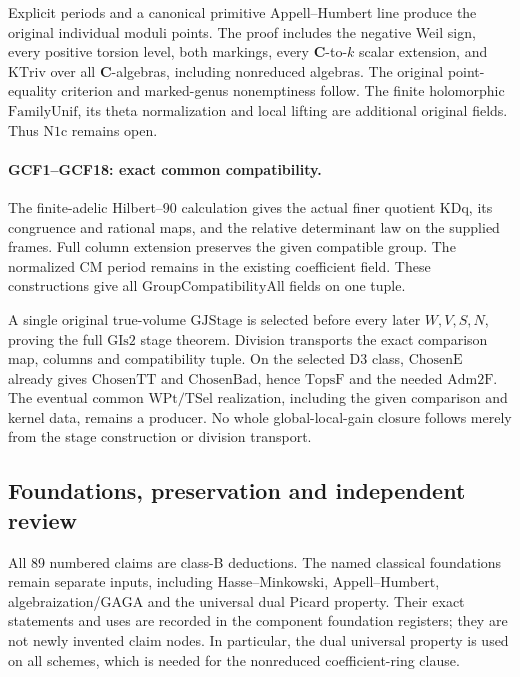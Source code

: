 Explicit periods and a canonical primitive Appell--Humbert line
produce the original individual moduli points. The proof includes
the negative Weil sign, every positive torsion level, both markings,
every \(\mathbf C\)-to-\(k\) scalar extension, and
\(\mathrm{KTriv}\) over all \(\mathbf C\)-algebras, including
nonreduced algebras. The original point-equality criterion and
marked-genus nonemptiness follow. The finite holomorphic
\(\mathrm{FamilyUnif}\), its theta normalization and local lifting
are additional original fields. Thus \(\mathrm{N1c}\) remains open.

\paragraph{GCF1--GCF18: exact common compatibility.}
The finite-adelic Hilbert--90 calculation gives the actual finer
quotient \(\mathrm{KDq}\), its congruence and rational maps, and
the relative determinant law on the supplied frames. Full column
extension preserves the given compatible group. The normalized CM
period remains in the existing coefficient field. These constructions
give all \(\mathrm{GroupCompatibilityAll}\) fields on one tuple.

A single original true-volume \(\mathrm{GJStage}\) is selected
before every later \(W,V,S,N\), proving the full
\(\mathrm{GIs2}\) stage theorem. Division transports the exact
comparison map, columns and compatibility tuple. On the selected
D3 class, \(\mathrm{ChosenE}\) already gives
\(\mathrm{ChosenTT}\) and \(\mathrm{ChosenBad}\), hence
\(\mathrm{TopsF}\) and the needed \(\mathrm{Adm2F}\).
The eventual common \(\mathrm{WPt}/\mathrm{TSel}\) realization,
including the given comparison and kernel data, remains a producer.
No whole global-local-gain closure follows merely from the stage
construction or division transport.

\subsection{Foundations, preservation and independent review}

All 89 numbered claims are class-B deductions. The named classical
foundations remain separate inputs, including Hasse--Minkowski,
Appell--Humbert, algebraization/GAGA and the universal dual Picard
property. Their exact statements and uses are recorded in the
component foundation registers; they are not newly invented claim
nodes. In particular, the dual universal property is used on all
schemes, which is needed for the nonreduced coefficient-ring clause.

